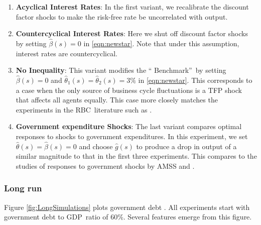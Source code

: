 \documentclass[thmsb,11pt]{article}
\begin{document}
{\begin{enumerate}
\item \textbf{Acyclical Interest Rates}: In the first variant, we recalibrate
the discount factor shocks to make the risk-free rate be uncorrelated with
output.

\item \textbf{Countercyclical Interest Rates}: Here we shut off  discount
factor shocks by setting $\hat{\beta}\left( s\right) =0$ in \eqref{eqn:newstar}. Note that under
this assumption, interest rates are countercyclical.

\item \textbf{No Inequality}: This variant modifies the \textquotedblleft
Benchmark\textquotedblright\ by setting $\hat{\beta}\left( s\right) =0$ and $%
{\hat{\theta}}_{1}(s)={\hat{\theta}}_{2}(s)=3\%$ in \eqref{eqn:newstar}. This corresponds to a case
when the only source of business cycle fluctuations is a TFP shock that
affects all agents equally. This case more closely matches the experiments
in the RBC\ literature such as \cite{Chari1994}.

\item \textbf{Government expenditure Shocks}: The last variant compares  optimal
responses to shocks to government expenditures. In this experiment, we set
$\hat{\theta}\left( s\right) =\hat{\beta}\left( s\right) =0$ and choose $%
\hat{g}\left( s\right) $ to produce a drop in output of a similar magnitude
to that in the first three experiments. This compares to the studies of
responses to government shocks by AMSS and \cite{Faraglia2011}.
\end{enumerate}

\subsubsection{Long run}

Figure \ref{fig:LongSimulations} plots government  debt . All
experiments start with government debt to GDP\ ratio of 60\%. Several
features emerge from this figure. %


}
\end{document}
